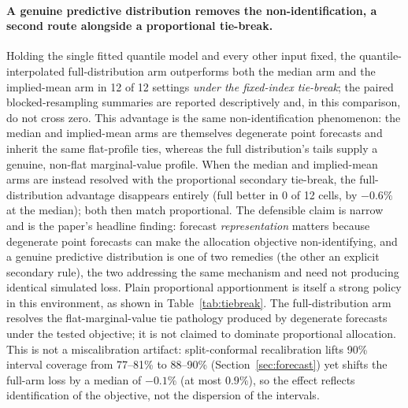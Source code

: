 \begin{table}[t]\centering\small
\caption{Objective non-identification under degenerate point forecasts.
``Tie \%'' is the share of sequential allocation steps at which more
than one active family attains the maximum marginal value (a per-step
statistic, not a fraction of the feasible allocation set); remaining
columns give the
point-forecast greedy policy's simulated loss under five tie-break
rules, as \% relative to proportional apportionment (negative $=$
worse). Full grid in the supplement. NYC = New York; SF = San
Francisco.}
\label{tab:tiebreak}
{\footnotesize}
\end{table}

\paragraph{A genuine predictive distribution removes the
non-identification, a second route alongside a proportional tie-break.}
Holding the single fitted quantile model and every other input fixed, the
quantile-interpolated full-distribution arm outperforms both the median
arm and the implied-mean arm in 12 of 12 settings \emph{under the
fixed-index tie-break}; the paired blocked-resampling summaries are
reported descriptively and, in this comparison, do not cross zero. This
advantage is the same non-identification phenomenon: the median and
implied-mean arms are themselves degenerate point forecasts and inherit
the same flat-profile ties, whereas the full distribution's tails supply
a genuine, non-flat marginal-value profile. When the median and
implied-mean arms are instead resolved with the proportional secondary
tie-break, the full-distribution advantage disappears entirely (full
better in 0 of 12 cells, by $-0.6\%$ at the median); both then match
proportional. The defensible claim is narrow and is the paper's headline
finding: forecast \emph{representation} matters because degenerate point
forecasts can make the allocation objective non-identifying, and a
genuine predictive distribution is one of two remedies (the other an
explicit secondary rule), the two addressing the same mechanism and need
not producing identical simulated loss. Plain proportional apportionment is
itself a strong policy in this environment, as shown in
Table~\ref{tab:tiebreak}. The full-distribution arm resolves the
flat-marginal-value tie pathology produced by degenerate forecasts under
the tested objective; it is not claimed to dominate proportional
allocation. This is not a miscalibration artifact: split-conformal
recalibration lifts 90\% interval coverage from 77--81\% to 88--90\%
(Section~\ref{sec:forecast}) yet shifts the full-arm loss by a median of
$-0.1\%$ (at most $0.9\%$), so the effect reflects identification of the
objective, not the dispersion of the intervals.

